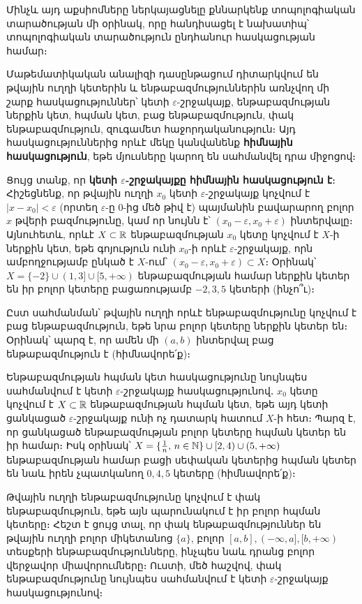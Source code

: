 \documentclass[./main.tex]{subfiles}
\begin{document}
\par Մինչև այդ աքսիոմները ներկայացնելը քննարկենք տոպոլոգիական տարածու\-թյան մի օրինակ, որը հանդիսացել է նախատիպ՝ տոպոլոգիական տարածություն ընդհանուր հասկացության համար։

\par Մաթեմատիկական անալիզի դասընթացում դիտարկվում են թվային ուղղի կե\-տե\-րին և ենթաբազ\-մություններին առնչվող մի շարք հասկացություններ՝ կետի $\varepsilon$-շրջակայք, ենթաբազմության ներքին կետ, հպման կետ, բաց ենթաբազմություն, փակ ենթաբազմություն, զուգամետ հաջորդականություն։ Այդ հասկացություններից որևէ մեկը կանվանենք \textbf{հիմնային հասկացություն}, եթե մյուսները կարող են սահ\-մանվել դրա միջոցով։

\par Ցույց տանք, որ \textbf{կետի $\varepsilon$-շրջակայքը հիմնային հասկացություն է}։ Հիշեցնենք, որ թվային ուղղի $x_0$ կետի $\varepsilon$-շրջակայք կոչվում է $|x-x_0|<\varepsilon$ (որտեղ $\varepsilon$-ը 0-ից մեծ թիվ է) պայմանին բավարարող բոլոր $x$ թվերի բազմությունը, կամ որ նույնն է՝ $(x_0-\varepsilon, x_0+\varepsilon)$ ինտերվալը։ Այնուհետև, որևէ $X \subset \mathbb{R}$ ենթաբազմության $x_0$ կետը կոչվում է $X$-ի ներքին կետ, եթե գոյություն ունի $x_0$-ի որևէ $\varepsilon$-շրջակայք, որն ամբողջությամբ ընկած է $X$-ում՝ $(x_0-\varepsilon,x_0+\varepsilon) \subset X$։ Օրինակ՝ $X=\{-2\} \cup (1,3] \cup [5,+\infty)$ ենթաբազմության համար ներքին կետեր են իր բոլոր կետերը բացառությամբ $-2,3,5$ կետերի (ինչո՞ւ)։

\par Ըստ սահմանման՝ թվային ուղղի որևէ ենթաբազմությունը կոչվում է բաց ենթաբազ\-մություն, եթե նրա բոլոր կետերը ներքին կետեր են։ Օրինակ՝ պարզ է, որ ամեն մի $(a,b)$ ինտերվալ բաց ենթաբազմություն է (հիմնավորե՛ք)։

\par Ենթաբազմության հպման կետ հասկացությունը նույնպես սահմանվում է կետի $\varepsilon$-շրջակայք հասկացությունով․ $x_0$ կետը կոչվում է $X \subset \mathbb{R}$ ենթաբազմության հպման կետ, եթե այդ կետի ցանկացած $\varepsilon$-շրջակայք ունի ոչ դատարկ հատում $X$-ի հետ։ Պարզ է, որ ցանկացած ենթաբազմության բոլոր կետերը հպման կետեր են իր համար։ Իսկ օրինակ՝ $X=\{\frac{1}{n},\, n \in \mathbb{N}\}\cup[2,4)\cup (5,+\infty)$ ենթաբազմության համար բացի սեփական կետերից հպման կետեր են նաև իրեն չպատկանող $0,4,5$ կետերը (հիմնավորե՛ք)։

\par Թվային ուղղի ենթաբազմությունը կոչվում է փակ ենթաբազմություն, եթե այն պարունակում է իր բոլոր հպման կետերը։ Հեշտ է ցույց տալ, որ փակ ենթաբազմություններ են թվային ուղղի բոլոր միկետանոց $\{a\}$, բոլոր $[a,b], (-\infty,a],[b,+\infty)$ տեսքերի ենթաբազմությունները, ինչպես նաև դրանց բոլոր վերջավոր միավորումները։ Ուստի, մեծ հաշվով, փակ ենթաբազմությունը նույնպես սահմանվում է կետի $\varepsilon$-շրջակայք հասկացությունով։
\end{document}
